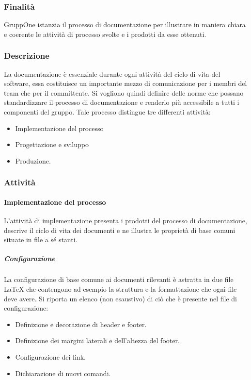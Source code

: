 \documentclass[../../norme-di-progetto.tex]{subfiles}
\begin{document}
\subsubsection{Finalità}%
\label{subs:documentazione/finalita}

GruppOne istanzia il processo di documentazione per illustrare in maniera chiara e coerente le attività di processo svolte e i prodotti da esse ottenuti.

\subsubsection{Descrizione}%
\label{subs:documentazione/descrizione}

La documentazione è essenziale durante ogni attività del ciclo di vita del software, essa costituisce un importante mezzo di comunicazione per i membri del team che per il committente.
Si vogliono quindi definire delle norme che possano standardizzare il processo di documentazione e renderlo più accessibile a tutti i componenti del gruppo.
Tale processo distingue tre differenti attività:
\begin{itemize}
  \item  Implementazione del processo
  \item  Progettazione e sviluppo
  \item  Produzione.
\end{itemize}

\subsubsection{Attività}%
\label{subs:documentazione/attivita}

\paragraph{Implementazione del processo}%
\label{par:documentazione/implementazione}
L'attività di implementazione presenta i prodotti del processo di documentazione, descrive il ciclo di vita dei documenti e ne illustra le proprietà di base comuni situate in file a sé stanti.

\subparagraph{Configurazione}%
\label{subp:configurazione}
La configurazione di base comune ai documenti rilevanti è astratta in due file \LaTeX{} che contengono ad esempio la struttura e la formattazione che ogni file deve avere.
Si riporta un elenco (non esaustivo) di ciò che è presente nel file di configurazione:

\begin{itemize}
  \item Definizione e decorazione di header e footer.
  \item Definizione dei margini laterali e dell'altezza del footer.
  \item Configurazione dei link.
  \item Dichiarazione di nuovi comandi.
\end{itemize}
\end{document}
